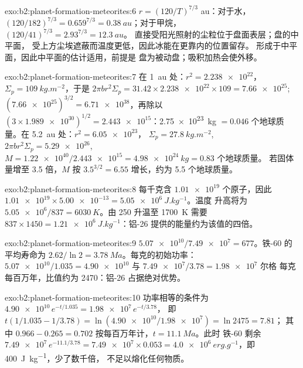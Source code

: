 \begin{solution}{exo:b2:planet-formation-meteorites:6}
$r = (120/T)^{7/3}$ au：对于水，$(120/182)^{7/3} = 0.659^{7/3} =
\qty{0.38}{au}$；对于甲烷，$(120/41)^{7/3} = 2.93^{7/3} = \qty{12.3}{au}$。
直接受阳光照射的尘粒位于盘面表层；盘的中平面，
受上方尘埃遮蔽而温度更低，因此冰能在更靠内的位置留存。
形成于中平面，因此中平面的估计适用，前提是
盘为被动盘；吸积加热会使外移。
\end{solution}

\begin{solution}{exo:b2:planet-formation-meteorites:7}
在 \qty{1}{au} 处：$r^2 = \num{2.238e22}$，$\Sigma_p = \qty{109}{kg.m^{-2}}$，于是
$2\pi b r^2\Sigma_p = 31.42\times\num{2.238e22}\times109 = \num{7.66e25}$;
$(\num{7.66e25})^{3/2} = \num{6.71e38}$，再除以
$(3\times\num{1.989e30})^{1/2} = \num{2.443e15}$：\qty{2.75e23}{kg}
$= 0.046$ 个地球质量。在 \qty{5.2}{au} 处：$r^2 = \num{6.05e23}$，
$\Sigma_p = \qty{27.8}{kg.m^{-2}}$, $2\pi b r^2\Sigma_p = \num{5.29e26}$,
$M = \num{1.22e40}/\num{2.443e15} = \qty{4.98e24}{kg} = 0.83$ 个地球质量。
若固体量增至 \num{3.5} 倍，$M$ 按 $3.5^{3/2} = 6.55$ 增长，约为 5.5
个地球质量。
\end{solution}

\begin{solution}{exo:b2:planet-formation-meteorites:8}
每千克含 $\num{1.01e19}$ 个原子，因此
$\num{1.01e19}\times\num{5.00e-13} = \qty{5.05e6}{J.kg^{-1}}$。温度
升高将为 $\num{5.05e6}/837 = \qty{6030}{K}$。由 \num{250} 升温至
\qty{1700}{K} 需要 $837\times1450 = \qty{1.21e6}{J.kg^{-1}}$：铝-26
提供的能量约为该值的四倍。
\end{solution}

\begin{solution}{exo:b2:planet-formation-meteorites:9}
$\num{5.07e10}/\num{7.49e7} = 677$。铁-60 的平均寿命为
$2.62/\ln2 = \qty{3.78}{Ma}$。每克的初始功率：
$\num{5.07e10}/1.035 = \num{4.90e10}$ 与 $\num{7.49e7}/3.78 = \num{1.98e7}$ 尔格
每克每百万年，比值约为 \num{2470}：铝-26 占据绝对优势。
\end{solution}

\begin{solution}{exo:b2:planet-formation-meteorites:10}
功率相等的条件为 $\num{4.90e10}\,e^{-t/1.035} = \num{1.98e7}\,e^{-t/3.78}$，
即 $t(1/1.035 - 1/3.78) = \ln(\num{4.90e10}/\num{1.98e7}) = \ln 2475 = 7.81$；
其中 $0.966 - 0.265 = 0.702$ 按每百万年计，$t = \qty{11.1}{Ma}$。此时
铁-60 剩余 $\num{7.49e7}\,e^{-11.1/3.78} = \num{7.49e7}\times0.053 =
\qty{4.0e6}{erg.g^{-1}}$，即 \qty{400}{J.kg^{-1}}，少了数千倍，
不足以熔化任何物质。
\end{solution}

